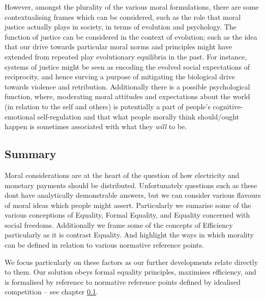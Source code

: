 However, amongst the plurality of the various moral formulations, there are some contextualising frames which can be considered, such as the role that moral justice actually plays in society, in terms of evolution and psychology.
The function of justice can be considered in the context of evolution; such as the idea that our drive towards particular moral norms and principles might have extended from repeated play evolutionary equilibria in the past. \cite{Binmore10785}
For instance, systems of justice might be seen as encoding the evolved social expectations of reciprocity, and hence surving a purpose of mitigating the biological drive towards violence and retribution.\cite{doi:10.1300/J135v02n04}
Additionally there is a possible psychological function, where, moderating moral attitudes and expectations about the world (in relation to the self and others) is potentially a part of people's cognitive-emotional self-regulation \cite{doi:10.1037/1089-2680.6.1.25, doi:10.1080/00981389.2019.1640337}
and that what people morally think should/ought happen is sometimes associated with what they \textit{will} to be.\cite{doi:10.1080/13869795.2016.1212395, sep-moral-motivation, LITZ2009695}

\subsection{Summary}

Moral considerations are at the heart of the question of how electricity and monetary payments should be distributed.
Unfortunately questions such as these dont have analytically demonstrable answers, but we can consider various flavours of moral ideas which people might assert.
Particularly we sumarise some of the various conceptions of Equality, Formal Equality, and Equality concerned with social freedoms.
Additionally we frame some of the concepts of Efficiency particularly as it is contrast Equality.
And highlight the ways in which morality can be defined in relation to various normative reference points.

We focus particularly on these factors as our further developments relate directly to them.
Our solution obeys formal equality principles, maximises efficiency, and is formalised by reference to normative reference points defined by idealised competition -- see chapter \ref{}.




